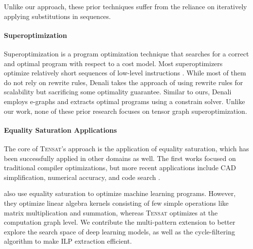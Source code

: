 \documentclass{article}
\newcommand{\TODO}[1]{\textcolor{red}{#1}}
\newcommand{\ourname}[0]{\textsc{Tensat}}
\begin{document}
Unlike our approach, these prior techniques suffer from the reliance on iteratively applying substitutions in sequences.


\paragraph{Superoptimization} 
Superoptimization is a program optimization technique that searches for a correct and optimal program with respect to a cost model. Most superoptimizers optimize relatively short sequences of low-level instructions \cite{massalin,denali,Bansal:peephole,stoke:asplos,stoke:pldi,greenthumb-asplos,greenthumb-cc,Souper}. While most of them do not rely on rewrite rules, Denali \cite{denali} takes the approach of using rewrite rules for scalability but sacrificing some optimality guarantee. Similar to ours, Denali \cite{denali} employs e-graphs and extracts optimal programs using a constrain solver. 
Unlike our work, none of these prior research focuses on tensor graph superoptimization.

\paragraph{Equality Saturation Applications}
The core of \ourname{}'s approach is the application of equality saturation, which has been successfully applied in other domains as well.
The first works \cite{eqsat, eqsat-llvm} focused on traditional compiler optimizations, but more recent applications include CAD simplification, numerical accuracy, and code search \cite{szalinski, herbie, yogo}.

\citet{spores} also use equality saturation to optimize machine learning programs. 
However, they optimize linear algebra kernels consisting of few simple
operations like matrix multiplication and summation, whereas \ourname{} optimizes at the 
computation graph level.
We contribute the multi-pattern extension to
better explore the search space of deep learning models, as well as the cycle-filtering
algorithm to make ILP extraction efficient. 

\end{document}
